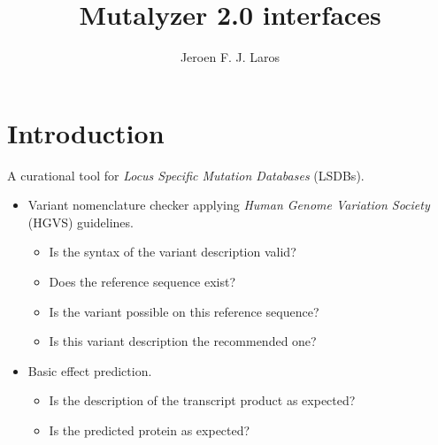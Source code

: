 \documentclass[slidestop]{beamer}
\title{Mutalyzer 2.0 interfaces}
\author{Jeroen F. J. Laros}
\begin{document}



\bodytemplate

\section{Introduction}
\begin{frame}
  A curational tool for \emph{Locus Specific Mutation Databases} (LSDBs).

  \bigskip
  \begin{itemize}
    \pause
    \item Variant nomenclature checker applying \emph{Human Genome Variation
          Society} (HGVS) guidelines.
    \begin{itemize}
      \item Is the syntax of the variant description valid?
      \item Does the reference sequence exist?
      \item Is the variant possible on this reference sequence?
      \item Is this variant description the recommended one?
    \end{itemize}
    \pause
    \item Basic effect prediction.
    \begin{itemize}
      \item Is the description of the transcript product as expected?
      \item Is the predicted protein as expected?
    \end{itemize}
  \end{itemize}
\end{frame}
\end{document}
